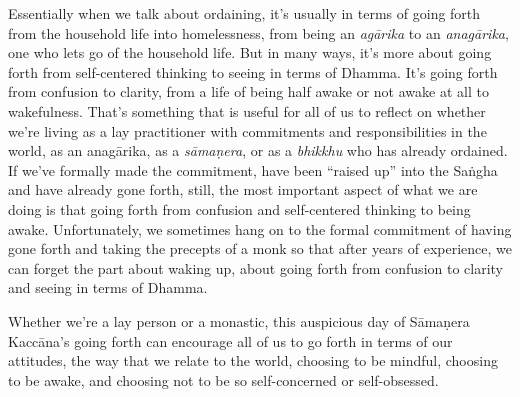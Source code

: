 Essentially when we talk about ordaining, it's usually in terms of 
going forth from the household life into homelessness, from being an 
\emph{agārika} to an \emph{anagārika}, one who lets go of the 
household life. But in many ways, it's more about going forth from 
self-centered thinking to seeing in terms of Dhamma. It's going forth 
from confusion to clarity, from a life of being half awake or not awake 
at all to wakefulness. That's something that is useful for all of us to 
reflect on whether we're living as a lay practitioner with commitments 
and responsibilities in the world, as an anagārika, as a 
\emph{sāmaṇera}, or as a \emph{bhikkhu} who has already ordained. If 
we've formally made the commitment, have been ``raised up'' into the 
Saṅgha and have already gone forth, still, the most important aspect 
of what we are doing is that going forth from confusion and 
self-centered thinking to being awake. Unfortunately, we sometimes hang 
on to the formal commitment of having gone forth and taking the 
precepts of a monk so that after years of experience, we can forget the 
part about waking up, about going forth from confusion to clarity and 
seeing in terms of Dhamma.

Whether we're a lay person or a monastic, this auspicious day of 
Sāmaṇera Kaccāna's going forth can encourage all of us to go forth 
in terms of our attitudes, the way that we relate to the world, 
choosing to be mindful, choosing to be awake, and choosing not to be so 
self-concerned or self-obsessed.

